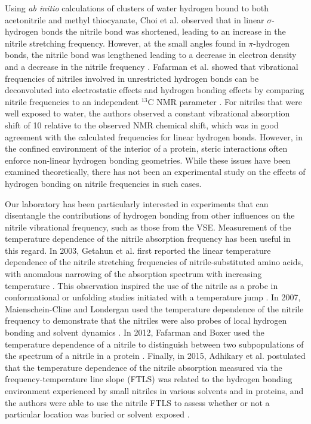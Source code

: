 Using \emph{ab initio} calculations of clusters of water hydrogen bound to both acetonitrile and methyl thiocyanate, Choi et al. observed that in linear $\sigma$-hydrogen bonds the nitrile bond was shortened, leading to an increase in the nitrile stretching frequency.
However, at the small angles found in $\pi$-hydrogen bonds, the nitrile bond was lengthened leading to a decrease in electron density and a decrease in the nitrile frequency \cite{Choi2008}.
Fafarman et al. showed that vibrational frequencies of nitriles involved in unrestricted hydrogen bonds can be deconvoluted into electrostatic effects and hydrogen bonding effects by comparing nitrile frequencies to an independent $^{13}$C NMR parameter \cite{Fafarman2010}.
For nitriles that were well exposed to water, the authors observed a constant vibrational absorption shift of 10 \si{\wn} relative to the observed NMR chemical shift, which was in good agreement with the calculated frequencies for linear hydrogen bonds.
However, in the confined environment of the interior of a protein, steric interactions often enforce non-linear hydrogen bonding geometries.
While these issues have been examined theoretically, there has not been an experimental study on the effects of hydrogen bonding on nitrile frequencies in such cases.

Our laboratory has been particularly interested in experiments that can disentangle the contributions of hydrogen bonding from other influences on the nitrile vibrational frequency, such as those from the VSE.
Measurement of the temperature dependence of the nitrile absorption frequency has been useful in this regard.
In 2003, Getahun et al. first reported the linear temperature dependence of the nitrile stretching frequencies of nitrile-substituted amino acids, with anomalous narrowing of the absorption spectrum with increasing temperature \cite{Getahun2003}.
This observation inspired the use of the nitrile as a probe in conformational or unfolding studies initiated with a temperature jump \cite{Getahun2003, Huang2003}.
In 2007, Maienschein-Cline and Londergan used the temperature dependence of the nitrile frequency to demonstrate that the nitriles were also probes of local hydrogen bonding and solvent dynamics \cite{Maienschein-Cline2007}.
In 2012, Fafarman and Boxer used the temperature dependence of a nitrile to distinguish between two subpopulations of the spectrum of a nitrile in a protein \cite{Fafarman2010a}.
Finally, in 2015, Adhikary et al. postulated that the temperature dependence of the nitrile absorption measured via the frequency-temperature line slope (FTLS) was related to the hydrogen bonding environment experienced by small nitriles in various solvents and in proteins, and the authors were able to use the nitrile FTLS to assess whether or not a particular location was buried or solvent exposed \cite{Adhikary2015}.


